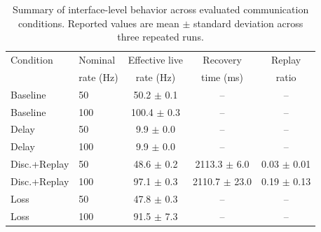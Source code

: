 \begin{table}[t]
\centering
\caption{Summary of interface-level behavior across evaluated communication conditions. Reported values are mean $\pm$ standard deviation across three repeated runs.}
\label{tab:results_main}
\scriptsize
\begin{tabular}{@{}llccc@{}}
\hline
Condition & Nominal & Effective live & Recovery & Replay \\
 & rate (Hz) & rate (Hz) & time (ms) & ratio \\
\hline
Baseline & 50 & 50.2 $\pm$ 0.1 & -- & -- \\
Baseline & 100 & 100.4 $\pm$ 0.3 & -- & -- \\
Delay & 50 & 9.9 $\pm$ 0.0 & -- & -- \\
Delay & 100 & 9.9 $\pm$ 0.0 & -- & -- \\
Disc.+Replay & 50 & 48.6 $\pm$ 0.2 & 2113.3 $\pm$ 6.0 & 0.03 $\pm$ 0.01 \\
Disc.+Replay & 100 & 97.1 $\pm$ 0.3 & 2110.7 $\pm$ 23.0 & 0.19 $\pm$ 0.13 \\
Loss & 50 & 47.8 $\pm$ 0.3 & -- & -- \\
Loss & 100 & 91.5 $\pm$ 7.3 & -- & -- \\
\hline
\end{tabular}
\end{table}
